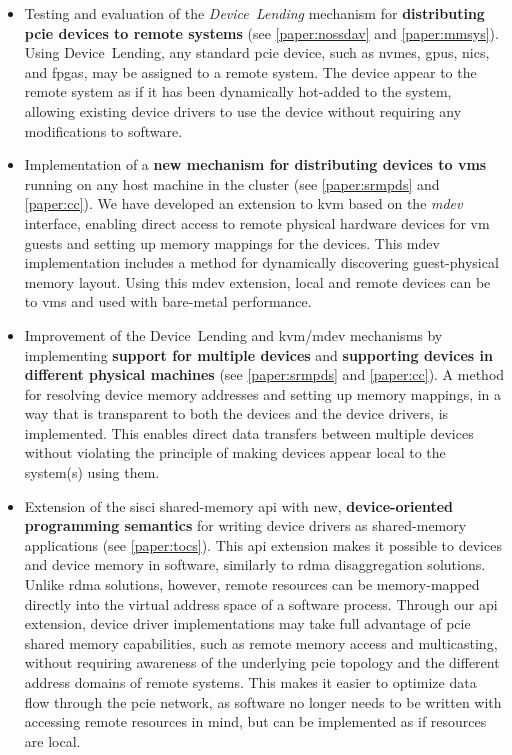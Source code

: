 \begin{itemize}
    \item Testing and evaluation of the \emph{Device~Lending} mechanism for \textbf{distributing \gls{pcie} devices to remote systems} (see \cref{paper:nossdav} and \cref{paper:mmsys}). Using Device~Lending, any standard \gls{pcie} device, such as \glspl{nvme}, \glspl{gpu}, \glspl{nic}, and \glspl{fpga}, may be assigned to a remote system. The device appear to the remote system as if it has been dynamically hot-added to the system, allowing existing device drivers to use the device without requiring any modifications to software.

    \item Implementation of a \textbf{new mechanism for distributing devices to \glspl{vm}} running on any host machine in the cluster (see \cref{paper:srmpds} and \cref{paper:cc}). We have developed an extension to \gls{kvm} based on the \emph{\gls{mdev}} interface, enabling direct access to remote physical hardware devices for \gls{vm} guests and setting up memory mappings for the devices. This \gls{mdev} implementation includes a method for dynamically discovering guest-physical memory layout. Using this \gls{mdev} extension, local and remote devices can be  to \glspl{vm} and used with bare-metal performance.
	
    \item Improvement of the Device~Lending and \gls{kvm}/\gls{mdev} mechanisms by implementing \textbf{support for multiple devices} and \textbf{supporting devices in different physical machines} (see \cref{paper:srmpds} and \cref{paper:cc}). A method for resolving device memory addresses and setting up memory mappings, in a way that is transparent to both the devices and the device drivers, is implemented. This enables direct data transfers between multiple devices without violating the principle of making devices appear local to the system(s) using them.

    \item Extension of the \gls{sisci} shared-memory \gls{api} with new, \textbf{device-oriented programming semantics} for writing device drivers as shared-memory applications (see \cref{paper:tocs}).
	This \gls{api} extension makes it possible to  devices and device memory in software, similarly to \gls{rdma} \gls{disaggregation} solutions.
	Unlike \gls{rdma} solutions, however, remote resources can be memory-mapped directly into the virtual address space of a software process.
	Through our \gls{api} extension, device driver implementations may take full advantage of \gls{pcie} shared memory capabilities, such as remote memory access and multicasting, without requiring awareness of the underlying \gls{pcie} topology and the different address domains of remote systems.
	This makes it easier to optimize data flow through the \gls{pcie} network, as software no longer needs to be written with accessing remote resources in mind, but can be implemented as if resources are local.


\end{itemize}
